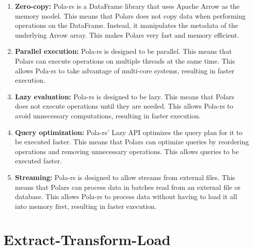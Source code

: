 \begin{enumerate}
    \itemsep1em
    \item \textbf{Zero-copy:} Pola-rs is a DataFrame library that uses Apache Arrow as the memory model. This means that Polars does not copy data when performing operations on the DataFrame. Instead, it manipulates the metadata of the underlying Arrow array. This makes Polars very fast and memory efficient.
    \item \textbf{Parallel execution:} Pola-rs is designed to be parallel. This means that Polars can execute operations on multiple threads at the same time. This allows Pola-rs to take advantage of multi-core systems, resulting in faster execution.
    \item \textbf{Lazy evaluation:} Pola-rs is designed to be lazy. This means that Polars does not execute operations until they are needed. This allows Pola-rs to avoid unnecessary computations, resulting in faster execution.
    \item \textbf{Query optimization:} Pola-rs' Lazy API optimizes the query plan for it to be executed faster. This means that Polars can optimize queries by reordering operations and removing unnecessary operations. This allows queries to be executed faster.
    \item \textbf{Streaming:} Pola-rs is designed to allow streams from external files. This means that Polars can process data in batches read from an external file or database. This allows Pola-rs to process data without having to load it all into memory first, resulting in faster execution.
\end{enumerate}

\section{Extract-Transform-Load}